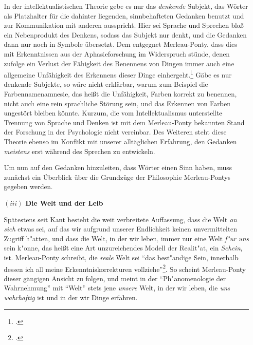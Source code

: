\documentclass[a4paper, 12pt]{article}
\begin{document}
\begin{onehalfspace}
In der intellektualistischen Theorie gebe es nur das \emph{denkende} Subjekt, das Wörter als Platzhalter für die dahinter liegenden, sinnbehafteten Gedanken benutzt und zur Kommunikation mit anderen ausspricht. Hier sei Sprache und Sprechen bloß ein Nebenprodukt des Denkens, sodass das Subjekt nur denkt, und die Gedanken dann nur noch in Symbole übersetzt. Dem entgegnet Merleau-Ponty, dass dies mit Erkenntnissen aus der Aphasieforschung im Widerspruch stünde, denen zufolge ein Verlust der Fähigkeit des Benennens von Dingen immer auch eine allgemeine Unfähigkeit des Erkennens dieser Dinge einhergeht.\footnote{\Cite[Vgl.][S. 208 f.]{merleau1966phanomenologie}.} Gäbe es nur denkende Subjekte, so wäre nicht erklärbar, warum zum Beispiel die Farbennamenamnesie, das heißt die Unfähigkeit, Farben korrekt zu benennen, nicht auch eine rein sprachliche Störung sein, und das Erkennen von Farben ungestört bleiben könnte. Kurzum, die vom Intellektualismus unterstellte Trennung von Sprache und Denken ist mit dem Merleau-Ponty bekannten Stand der Forschung in der Psychologie nicht vereinbar. Des Weiteren steht diese Theorie ebenso im Konflikt mit unserer alltäglichen Erfahrung, den Gedanken \emph{meistens} erst während des Sprechen zu entwickeln.

Um nun auf den Gedanken hinzuleiten, dass Wörter einen Sinn haben, muss zunächst ein Überblick über die Grundzüge der Philosophie Merleau-Pontys gegeben werden.

\vspace{5mm}

\noindent\textbf{$(iii)$ Die Welt und der Leib}

\noindent Spätestens seit Kant besteht die weit verbreitete Auffassung, dass die Welt \emph{an sich} etwas sei, auf das wir aufgrund unserer Endlichkeit keinen unvermittelten Zugriff h"atten, und dass die Welt, in der wir leben, immer nur eine Welt \emph{f"ur uns} sein k"onne, das heißt eine Art unzureichendes Modell der Realit"at, ein \emph{Schein}, ist. Merleau-Ponty schreibt, die \emph{reale} Welt sei "`das best"andige Sein, innerhalb dessen ich all meine Erkenntniskorrekturen vollziehe"'\footnote{\Cite[Siehe][S. 379]{merleau1966phanomenologie}.}. So scheint Merleau-Ponty dieser gängigen Ansicht zu folgen, und meint in der "`Ph"anomenologie der Wahrnehmung"' mit "`Welt"' stets jene \emph{unsere} Welt, in der wir leben, die \emph{uns wahrhaftig} ist und in der wir Dinge erfahren. 


\end{onehalfspace}
\end{document}
